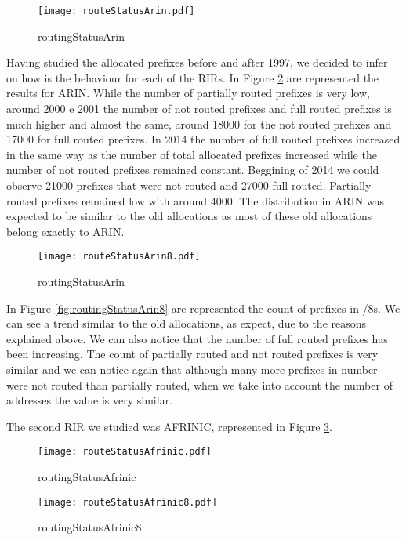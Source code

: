 \documentclass[11pt,a4paper]{scrreprt}
\begin{document}
\begin{figure}[ht!]
\centering
\texttt{[image: routeStatusArin.pdf]}
\caption{routingStatusArin}
\label{fig:routingStatusArin}
\end{figure}

Having studied the allocated prefixes before and after 1997, we decided to infer on how is the behaviour for each of the RIRs. In Figure \ref{fig:routingStatusArin} are represented the results for ARIN.  
While the number of partially routed prefixes is very low, around 2000 e 2001 the number of not routed prefixes and full routed prefixes is much higher and almost the same, around 18000 for the not routed prefixes and 17000 for full routed prefixes. In 2014 the number of full routed prefixes increased in the same way as the number of total allocated prefixes increased while the number of not routed prefixes remained constant. Beggining of 2014 we could observe 21000 prefixes that were not routed and 27000 full routed. Partially routed prefixes remained low with around 4000. The distribution in ARIN was expected to be similar to the old allocations as most of these old allocations belong exactly to ARIN. 

\begin{figure}[ht!]
\centering
\texttt{[image: routeStatusArin8.pdf]}
\caption{routingStatusArin}
\label{fig:routingStatusArin}
\end{figure}

In Figure \ref{fig:routingStatusArin8} are represented the count of prefixes in /8s. We can see a trend similar to the old allocations, as expect, due to the reasons explained above. We can also notice that the number of full routed prefixes has been increasing. The count of partially routed and not routed prefixes is very similar and we can notice again that although many more prefixes in number were not routed than partially routed, when we take into account the number of addresses the value is very similar. 

The second RIR we studied was AFRINIC, represented in Figure \ref{fig:routingStatusAfrinic}.

\begin{figure}[ht!]
\centering
\texttt{[image: routeStatusAfrinic.pdf]}
\caption{routingStatusAfrinic}
\label{fig:routingStatusAfrinic}
\end{figure}

\begin{figure}[ht!]
\centering
\texttt{[image: routeStatusAfrinic8.pdf]}
\caption{routingStatusAfrinic8}
\label{fig:routingStatusAfrinic8}
\end{figure}
\end{document}

